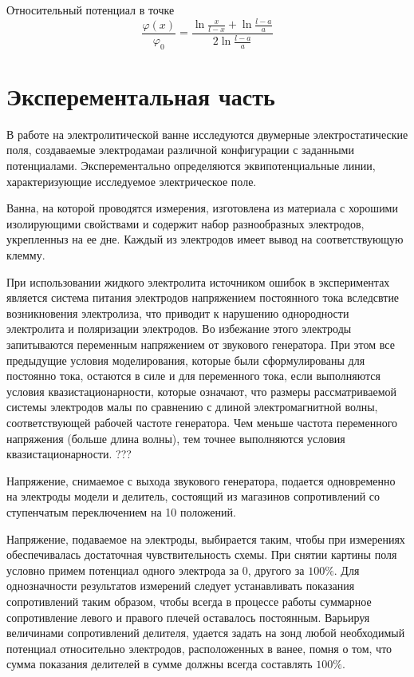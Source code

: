 Относительный потенциал в точке
\begin{equation*}
  \frac{\varphi(x)}{\varphi_0} = \frac{\ln{\frac{x}{l - x}} + \ln{\frac{l - a}{a}}}{2\ln{\frac{l - a}{a}}}  
\end{equation*}


\section*{Эксперементальная часть}

В работе на электролитической ванне исследуются двумерные электростатические поля, создаваемые электродамаи различной конфигурации с заданными потенциалами. Эксперементально определяются эквипотенциальные линии, характеризующие исследуемое электрическое поле.

Ванна, на которой проводятся измерения, изготовлена из материала с хорошими изолирующими свойствами и содержит набор разнообразных электродов, укрепленныз на ее дне. Каждый из электродов имеет вывод на соответствующую клемму. 

При использовании жидкого электролита источником ошибок в экспериментах является система питания электродов напряжением постоянного тока вследсвтие возникновения электролиза, что приводит к нарушению однородности электролита и поляризации электродов. Во избежание этого электроды запитываются переменным напряжением от звукового генератора. При этом все предыдущие условия моделирования, которые были сформулированы для постоянно тока, остаются в силе и для переменного тока, если выполняются условия квазистационарности, которые означают, что размеры рассматриваемой системы электродов малы по сравнению с длиной электромагнитной волны, соответствующей рабочей частоте генератора. Чем меньше частота переменного напряжения (больше длина волны), тем точнее выполняются условия квазистационарности. ???

Напряжение, снимаемое с выхода звукового генератора, подается одновременно на электроды модели и делитель, состоящий из магазинов сопротивлений со ступенчатым переключением на 10 положений.

Напряжение, подаваемое на электроды, выбирается таким, чтобы при измерениях обеспечивалась достаточная чувствительность схемы. При снятии картины поля условно примем потенциал одного электрода за $0$, другого за $100\%$. Для однозначности результатов измерений следует устанавливать показания сопротивлений таким образом, чтобы всегда в процессе работы суммарное сопротивление левого и правого плечей оставалось постоянным. Варьируя величинами сопротивлений делителя, удается задать на зонд любой необходимый потенциал относительно электродов, расположенных в ванее, помня о том, что сумма показания делителей в сумме должны всегда составлять $100\%$.

